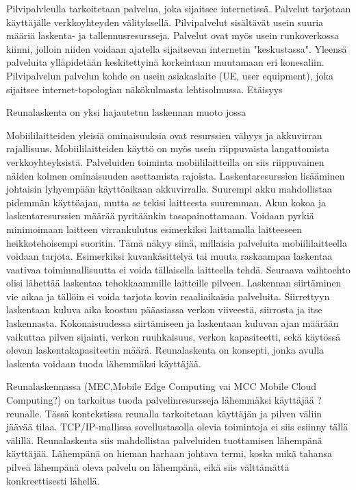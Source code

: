 \documentclass[finnish]{tktltiki2}
\theoremstyle{definition}
\theoremstyle{remark}
\begin{document}
Pilvipalvleulla tarkoitetaan palvelua, joka sijaitsee internetissä. Palvelut tarjotaan käyttäjälle verkkoyhteyden välityksellä.
Pilvipalvelut sisältävät usein suuria määriä laskenta- ja tallennusresursseja. Palvelut ovat myös usein runkoverkossa kiinni, jolloin niiden voidaan ajatella sijaitsevan internetin "keskustassa".
Yleensä palveluita ylläpidetään keskitettyinä korkeintaan muutamaan eri konesaliin.
Pilvipalvelun palvelun kohde on usein asiakaslaite (UE, user equipment), joka sijaitsee internet-topologian näkökulmasta lehtisolmussa. Etäisyys 

Reunalaskenta on yksi hajautetun laskennan muoto jossa 

Mobiililaitteiden yleisiä ominaisuuksia ovat resurssien vähyys ja akkuvirran rajallisuus. Mobiililaitteiden käyttö on myös usein riippuvaista langattomista verkkoyhteyksistä.
Palveluiden toiminta mobiililaitteilla on siis riippuvainen näiden kolmen ominaisuuden asettamista rajoista.
Laskentaresurssien lisääminen johtaisin lyhyempään käyttöaikaan akkuvirralla. Suurempi akku mahdollistaa pidemmän käyttöajan, mutta se tekisi laitteesta suuremman. Akun kokoa ja laskentaresurssien määrää pyritäänkin tasapainottamaan.
Voidaan pyrkiä minimoimaan laitteen virrankulutus esimerkiksi laittamalla laitteeseen heikkotehoisempi suoritin. Tämä näkyy siinä, millaisia palveluita mobiililaitteella voidaan tarjota.
Esimerkiksi kuvankäsittelyä tai muuta raskaampaa laskentaa vaativaa toiminnallisuutta ei voida tällaisella laitteella tehdä. 
Seuraava vaihtoehto olisi lähettää laskentaa tehokkaammille laitteille pilveen. Laskennan siirtäminen vie aikaa ja tällöin ei voida tarjota kovin reaaliaikaisia palveluita.
Siirrettyyn laskentaan kuluva aika koostuu pääasiassa verkon viiveestä, siirrosta ja itse laskennasta. 
Kokonaisuudessa siirtämiseen ja laskentaan kuluvan ajan määrään vaikuttaa pilven sijainti, verkon ruuhkaisuus, verkon kapasiteetti, sekä käytössä olevan laskentakapasiteetin määrä.
Reunalaskenta on konsepti, jonka avulla laskenta voidaan tuoda lähemmäksi käyttäjää.

Reunalaskennassa (MEC,Mobile Edge Computing vai MCC Mobile Cloud Computing?) on tarkoitus tuoda palvelinresursseja lähemmäksi käyttäjää ? reunalle.
Tässä kontekstissa reunalla tarkoitetaan käyttäjän ja pilven väliin jäävää tilaa. TCP/IP-mallissa sovellustasolla olevia toimintoja ei siis esiinny tällä välillä.
Reunalaskenta siis mahdollistaa palveluiden tuottamisen lähempänä käyttäjää. Lähempänä on hieman harhaan johtava termi, koska mikä tahansa pilveä lähempänä oleva palvelu on lähempänä, eikä siis välttämättä konkreettisesti lähellä. 
\end{document}
